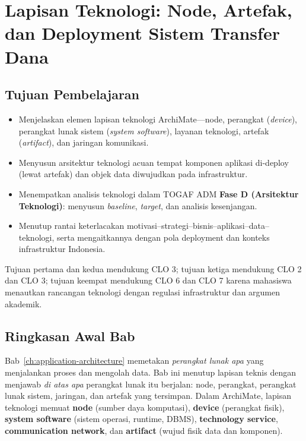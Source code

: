 \chapter[Lapisan Teknologi: Node, Artefak, dan Deployment]{Lapisan Teknologi:
Node, Artefak, dan Deployment Sistem Transfer Dana}
\label{ch:technology-architecture}
\setlength{\emergencystretch}{2em}

\section*{Tujuan Pembelajaran}
\begin{itemize}
  \item Menjelaskan elemen lapisan teknologi ArchiMate---node, perangkat
        (\emph{device}), perangkat lunak sistem (\emph{system software}), layanan
        teknologi, artefak (\emph{artifact}), dan jaringan komunikasi.
  \item Menyusun arsitektur teknologi acuan tempat komponen aplikasi di-deploy
        (lewat artefak) dan objek data diwujudkan pada infrastruktur.
  \item Menempatkan analisis teknologi dalam TOGAF ADM \textbf{Fase D (Arsitektur
        Teknologi)}: menyusun \emph{baseline}, \emph{target}, dan analisis
        kesenjangan.
  \item Menutup rantai keterlacakan motivasi--strategi--bisnis--aplikasi--data--
        teknologi, serta mengaitkannya dengan pola deployment dan konteks
        infrastruktur Indonesia.
\end{itemize}

Tujuan pertama dan kedua mendukung CLO 3; tujuan ketiga mendukung CLO 2 dan
CLO 3; tujuan keempat mendukung CLO 6 dan CLO 7 karena mahasiswa menautkan
rancangan teknologi dengan regulasi infrastruktur dan argumen akademik.

\section{Ringkasan Awal Bab}

Bab~\ref{ch:application-architecture} memetakan \emph{perangkat lunak apa} yang
menjalankan proses dan mengolah data. Bab ini menutup lapisan teknis dengan
menjawab \emph{di atas apa} perangkat lunak itu berjalan: node, perangkat,
perangkat lunak sistem, jaringan, dan artefak yang tersimpan. Dalam ArchiMate,
lapisan teknologi memuat \textbf{node} (sumber daya komputasi), \textbf{device}
(perangkat fisik), \textbf{system software} (sistem operasi, runtime, DBMS),
\textbf{technology service}, \textbf{communication network}, dan
\textbf{artifact} (wujud fisik data dan komponen).


